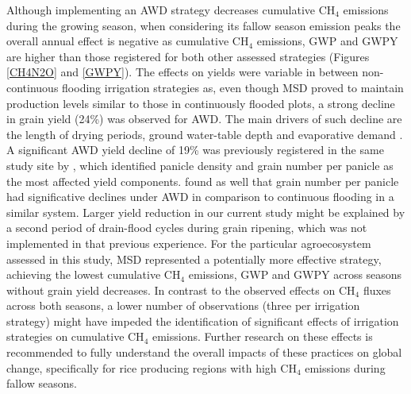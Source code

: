 Although implementing an AWD strategy decreases cumulative CH$_{4}$ emissions during the growing season, when considering its fallow season emission peaks the overall annual effect is negative as cumulative CH$_{4}$ emissions, GWP and GWPY are higher than those registered for both other assessed strategies (Figures \ref{CH4N2O} and \ref{GWPY}). The effects on yields were variable in between non-continuous flooding irrigation strategies as, even though MSD proved to maintain production levels similar to those in continuously flooded plots, a strong decline in grain yield (24\%) was observed for AWD. The main drivers of such decline are the length of drying periods, ground water-table depth and evaporative demand \citep{tuong2003rice}. A significant AWD yield decline of 19\% was previously registered in the same study site by \cite{martinez-eixarch2021}, which identified panicle density and grain number per panicle as the most affected yield components. \cite{monaco2021} found as well that grain number per panicle had significative declines under AWD in comparison to continuous flooding in a similar system. Larger yield reduction in our current study might be explained by a second period of drain-flood cycles during grain ripening, which was not implemented in that previous experience. For the particular agroecosystem assessed in this study, MSD represented a potentially more effective strategy, achieving the lowest cumulative CH$_{4}$ emissions, GWP and GWPY across seasons without grain yield decreases. In contrast to the observed effects on CH$_{4}$ fluxes across both seasons, a lower number of observations (three per irrigation strategy) might have impeded the identification of significant effects of irrigation strategies on cumulative CH$_{4}$ emissions. Further research on these effects is recommended to fully understand the overall impacts of these practices on global change, specifically for rice producing regions with high CH$_{4}$ emissions during fallow seasons.\\ 

